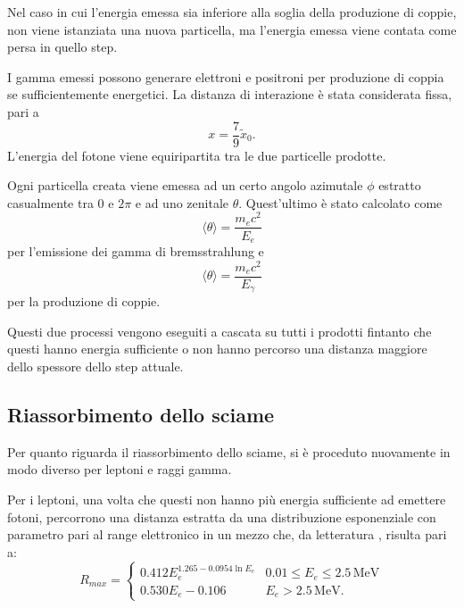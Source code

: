 \documentclass[10pt,a4paper,usenatbib]{article}
\newcommand*{\unit}[1]{\ensuremath{\mathrm{\,#1}}}                              %
\begin{document}
Nel caso in cui l'energia emessa sia inferiore alla soglia della produzione di coppie, non viene istanziata una nuova particella, ma l'energia emessa viene contata come persa in quello step.

\bigskip

I gamma emessi possono generare elettroni e positroni per produzione di coppia se sufficientemente energetici. La distanza di interazione è stata considerata fissa, pari a 
\begin{equation}
x = \frac{7}{9}\tilde{x}_0.
\end{equation}
L'energia del fotone viene equiripartita tra le due particelle prodotte.

Ogni particella creata viene emessa ad un certo angolo azimutale $\phi$ estratto casualmente tra 0 e $2\pi$ e ad uno zenitale $\theta$. Quest'ultimo  è stato calcolato come
\begin{equation}
\langle\theta\rangle = \frac{m_e c^2}{E_e}
\end{equation}
per l'emissione dei gamma di bremsstrahlung e 
\begin{equation}
\langle\theta\rangle = \frac{m_e c^2}{E_\gamma}
\end{equation}
per la produzione di coppie. 

Questi due processi vengono eseguiti a cascata su tutti i prodotti fintanto che questi hanno energia sufficiente o non hanno percorso una distanza maggiore dello spessore dello step attuale.

\subsection{Riassorbimento dello sciame}
\label{subsec:riassorb}
Per quanto riguarda il riassorbimento dello sciame, si è proceduto nuovamente in modo diverso per leptoni e raggi gamma. 

Per i leptoni, una volta che questi non hanno più energia sufficiente ad emettere fotoni, percorrono una distanza estratta da una distribuzione esponenziale con parametro pari al range elettronico in un mezzo che, da letteratura \citep{RevModPhys.24.28}, risulta pari a: 
\begin{equation}
R_{max} = \begin{cases} 0.412 E_e^{1.265-0.0954 \ln{E_e}}     & 0.01\le E_e \le 2.5\unit{MeV} \\ 
                                          0.530 E_e - 0.106                                   & E_e > 2.5\unit{MeV}. 
                   \end{cases}
\end{equation}
\end{document}
